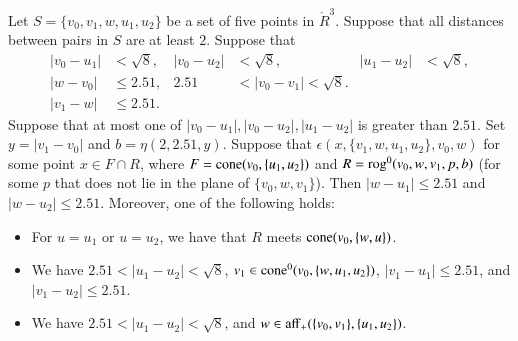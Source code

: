 \begin{lemma}
 Let $S=\{v_0,v_1,w,u_1,u_2\}$ be a set of five points
in $\ring{R}^3$.  
Suppose that all distances between pairs in $S$ are at least $2$.
Suppose that 
   $$
   \begin{array}{rlrlrll}
   |v_0-u_1|&<\sqrt8,& |v_0-u_2|&<\sqrt8,& |u_1-u_2|&<\sqrt8,\\
   |w-v_0|&\le 2.51, &2.51&<|v_0-v_1|<\sqrt8.\\
   |v_1-w|&\le 2.51.
   \end{array}
   $$
Suppose that at most one of $|v_0-u_1|,|v_0-u_2|,|u_1-u_2|$ is
greater than $2.51$.
%
Set $y=|v_1-v_0|$ and $b=\eta(2,2.51,y)$.
Suppose that $\epsilon(x,\{v_1,w,u_1,u_2\},v_0,w)$ for some point
$x\in F\cap R$, where $F={\operatorname{cone}}(v_0,\{u_1,u_2\})$ and
$R={\operatorname{rog}}^0(v_0,w,v_1,p,b)$ (for some $p$ that
does not lie in the plane of $\{v_0,w,v_1\}$).
Then $|w-u_1|\le 2.51$ and  $|w-u_2|\le 2.51$.
Moreover, one of the following holds:
  \begin{itemize}
  \item
  For $u=u_1$ or $u=u_2$, we have that
  $R$ meets ${\operatorname{cone}}(v_0,\{w,u\})$.
  \item  We have $2.51<|u_1-u_2|<\sqrt8$, 
  $v_1\in{\operatorname{cone}}^0(v_0,\{w,u_1,u_2\})$, 
  $|v_1-u_1|\le 2.51$, and $|v_1-u_2|\le 2.51$.
  \item  We have $2.51<|u_1-u_2|<\sqrt8$, and 
  $w\in{\operatorname{aff}}_+(\{v_0,v_1\},\{u_1,u_2\})$.
  \end{itemize}
\end{lemma}

